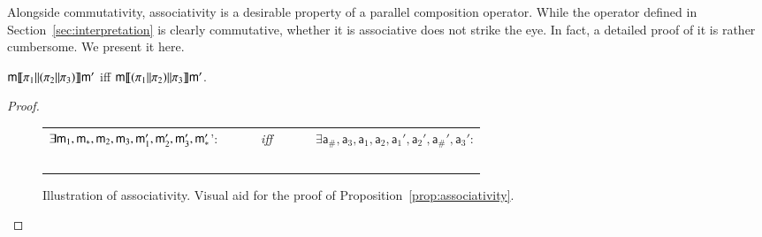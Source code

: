 \newcommand{\modla}{\mathsf a}
\newcommand{\readseta}{\mathsf {Rda}}
\newcommand{\writeseta}{\mathsf {Wra}}
\newcommand{\valuseta}{\mathsf {Va}}

Alongside commutativity, associativity is a desirable property of a parallel composition operator. While the operator defined in Section~\ref{sec:interpretation} is clearly commutative, whether it is associative does not strike the eye. In fact, a detailed proof of it is rather cumbersome. We present it here.

\begin{proposition}\label{prop:associativity}
$\mathsf m \llbracket  \pi_1 {||} (\pi_2 {||} \pi_3)  \rrbracket \mathsf m'$ iff $\mathsf m \llbracket  (\pi_1 {||} \pi_2) {||} \pi_3  \rrbracket \mathsf m'$.
\end{proposition}
\begin{proof}


  \begin{figure}%
    \centering
    \begin{tabular}{lcl}
      $\exists \mathsf m_1, \mathsf m_*, \mathsf m_2, \mathsf m_3, \mathsf m'_1, \mathsf m'_2, \mathsf m'_3, \mathsf m'_*$': &  ~~~~~\emph{iff}~~~~~&    $\exists \modla_\#, \modla_3, \modla_1, \modla_2, \modla_1', \modla_2', \modla_\#', \modla_3'$:\\
      
      & ~ &
      
    \end{tabular}
    \caption{\label{fig:illustration-associativity} Illustration of associativity. Visual aid for the proof of Proposition~\ref{prop:associativity}.}
  \end{figure}
  






\end{proof}
